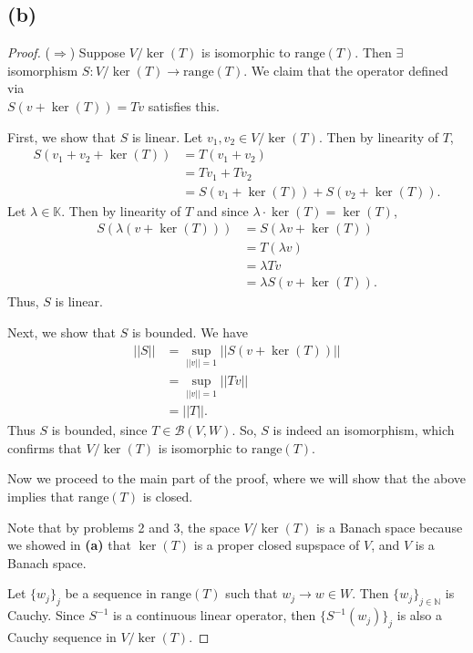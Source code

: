 \documentclass{article}
\begin{document}
\subsection*{(b)}
\begin{proof}
	($\Rightarrow$) Suppose $V/\ker{(T)}$ is isomorphic to $\textrm{range}(T)$. Then $\exists$ isomorphism $S:V/\ker{(T)} \longrightarrow \textrm{range}(T)$. We claim that the operator defined via \\ $S(v + \ker{(T)}) = Tv$ satisfies this. 
	
	First, we show that $S$ is linear. Let $v_1, v_2 \in V/\ker{(T)}$. Then by linearity of $T$,
	\begin{align}
		S(v_1 + v_2 + \ker{(T)}) &= T(v_1 + v_2) \\
		&= Tv_1 + Tv_2 \\
		&= S(v_1 + \ker{(T)}) + S(v_2 + \ker{(T)}).
	\end{align}
	Let $\lambda \in \mathbb{K}$. Then by linearity of $T$ and since $\lambda \cdot \ker{(T)} = \ker{(T)}$,
	\begin{align}
		S(\lambda (v + \ker{(T)})) &= S(\lambda v + \ker{(T)}) \\
		&= T(\lambda v) \\
		&= \lambda Tv\\
		&= \lambda S(v+ \ker{(T)}).
	\end{align}
	Thus, $S$ is linear.
	
	Next, we show that $S$ is bounded. We have
	\begin{align}
		||S|| &= \sup\limits_{||v|| = 1}||S(v + \ker{(T)})|| \\
		&= \sup\limits_{||v|| = 1}||Tv|| \\
		&= ||T||.
	\end{align}
	Thus $S$ is bounded, since $T\in\mathcal{B}(V,W)$. 
	So, $S$ is indeed an isomorphism, which confirms that $V/\ker{(T)}$ is isomorphic to $\textrm{range}(T)$.
	
	Now we proceed to the main part of the proof, where we will show that the above implies that $\textrm{range}(T)$ is closed.
	
	Note that by problems 2 and 3, the space $V/\ker{(T)}$ is a Banach space because we showed in \textbf{(a)} that $\ker{(T)}$ is a proper closed supspace of $V$, and $V$ is a Banach space. 
	
	Let $\{w_j\}_j$ be a sequence in $\textrm{range}(T)$ such that $w_j \rightarrow w \in W$. Then $\{w_j\}_{j\in\mathbb{N}}$ is Cauchy. Since $S^{-1}$ is a continuous linear operator, then $\{S^{-1}(w_j)\}_j$ is also a Cauchy sequence in $V/\ker{(T)}$. 
	

\end{proof}
\end{document}
